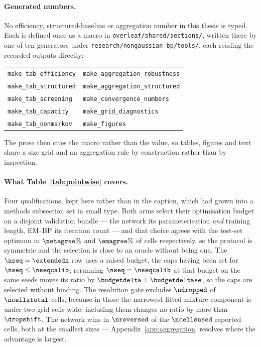\paragraph{Generated numbers.} No efficiency, structured-baseline or
aggregation number in this thesis is typed. Each is defined once as a macro in
\texttt{overleaf/shared/sections/}, written there by one of ten generators
under \texttt{research/nongaussian-bp/tools/}, each reading the recorded outputs
directly:

\begin{center}\small
\begin{tabular}{@{}ll@{}}
\texttt{make\_tab\_efficiency} & \texttt{make\_aggregation\_robustness} \\
\texttt{make\_tab\_structured} & \texttt{make\_aggregation\_structured} \\
\texttt{make\_tab\_screening}  & \texttt{make\_convergence\_numbers} \\
\texttt{make\_tab\_capacity}   & \texttt{make\_grid\_diagnostics} \\
\texttt{make\_tab\_nonmarkov}  & \texttt{make\_figures} \\
\end{tabular}
\end{center}

\noindent The prose then cites the macro rather than the value, so tables,
figures and text share a size grid and an aggregation rule by construction
rather than by inspection.

\paragraph{What Table~\ref{tab:pointwise} covers.} Four qualifications, kept
here rather than in the caption, which had grown into a methods subsection
set in small type. Both arms select their optimisation budget on a disjoint
validation bundle --- the network its parameterisation \emph{and} training
length, EM--BP its iteration count --- and that choice agrees with the
test-set optimum in $\netagree\%$ and $\emagree\%$ of cells respectively, so
the protocol is symmetric and the selection is close to an oracle without
being one. The $\nseq=\extendedn$ row uses a raised budget, the caps having
been set for $\nseq\le\nseqcalib$; rerunning $\nseq=\nseqcalib$ at that budget
on the same seeds moves its ratio by $\budgetdelta\pm\budgetdeltase$, so the
caps are selected without binding. The resolution gate excludes $\ndropped$ of
$\ncellstotal$ cells, because in those the narrowest fitted mixture component is
under two grid cells wide; including them changes no ratio by more than
$\dropshift$. The network wins in $\nreversed$ of the $\ncellsused$ reported
cells, both at the smallest sizes --- Appendix~\ref{app:aggregation} resolves
where the advantage is largest.

